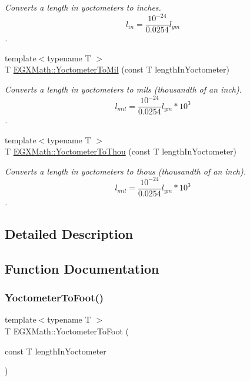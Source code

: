 \begin{DoxyCompactItemize}
\begin{DoxyCompactList}\small\item\em Converts a length in yoctometers to inches. \[ l_{in}= \frac{10^{-24}}{0.0254} l_{ym} \]. \end{DoxyCompactList}\item 
{\footnotesize template$<$typename T $>$ }\\T \mbox{\hyperlink{group___e_g_x_math-_conversions-_length_conversions-_yoctometer-_imperial_gacb2a1154ec79cfd130de96e92dfeedfa}{E\+G\+X\+Math\+::\+Yoctometer\+To\+Mil}} (const T length\+In\+Yoctometer)
\begin{DoxyCompactList}\small\item\em Converts a length in yoctometers to mils (thousandth of an inch). \[ l_{mil}= \frac{10^{-24}}{0.0254} l_{ym} * 10^{3} \]. \end{DoxyCompactList}\item 
{\footnotesize template$<$typename T $>$ }\\T \mbox{\hyperlink{group___e_g_x_math-_conversions-_length_conversions-_yoctometer-_imperial_ga9c2fbce1711afe0740edd868815ffea1}{E\+G\+X\+Math\+::\+Yoctometer\+To\+Thou}} (const T length\+In\+Yoctometer)
\begin{DoxyCompactList}\small\item\em Converts a length in yoctometers to thous (thousandth of an inch). \[ l_{mil}= \frac{10^{-24}}{0.0254} l_{ym} * 10^{3} \]. \end{DoxyCompactList}\end{DoxyCompactItemize}


\subsection{Detailed Description}


\subsection{Function Documentation}
\mbox{\label{group___e_g_x_math-_conversions-_length_conversions-_yoctometer-_imperial_gad8cb5223284af20fc0d29fefa17ec091}} 
\subsubsection{\texorpdfstring{Yoctometer\+To\+Foot()}{YoctometerToFoot()}}
{\footnotesize\ttfamily template$<$typename T $>$ \\
T E\+G\+X\+Math\+::\+Yoctometer\+To\+Foot (\begin{DoxyParamCaption}\item[{const T}]{length\+In\+Yoctometer }\end{DoxyParamCaption})}



